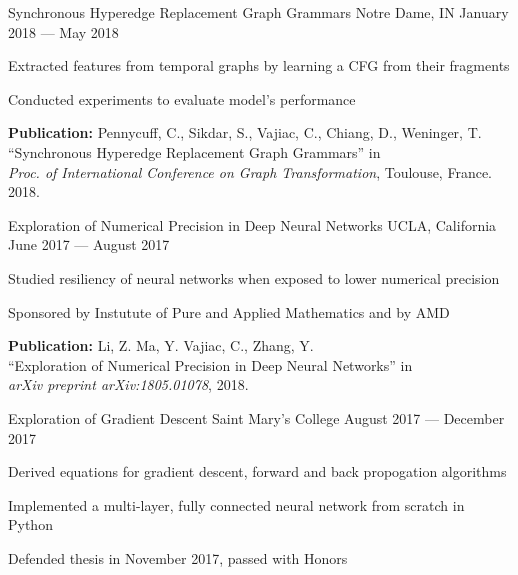 \begin{cventries}
  {Synchronous Hyperedge Replacement Graph Grammars}
  {Notre Dame, IN}
  {January 2018 --- May 2018}
  {\begin{cvitems}
    \item Extracted features from temporal graphs by learning a CFG from their
      fragments
    \item Conducted experiments to evaluate model's performance
    \item \textbf{ Publication:}
      Pennycuff, C., Sikdar, S., Vajiac, C., Chiang, D., Weninger, T. \\
      ``Synchronous Hyperedge Replacement Graph Grammars'' in \\
      \textit{Proc. of International Conference on Graph Transformation},
      Toulouse, France. 2018.
    \end{cvitems}
  }
  {Exploration of Numerical Precision in Deep Neural Networks}
  {UCLA, California}
  {June 2017 --- August 2017}
  {\begin{cvitems}
    \item Studied resiliency of neural networks when exposed to lower numerical precision
    \item Sponsored by Instutute of Pure and Applied Mathematics and by AMD
    \item 
      \textbf{ Publication:} Li, Z. Ma, Y. Vajiac, C., Zhang, Y. \\
      ``Exploration of Numerical Precision in Deep Neural Networks'' in \\
        \textit{arXiv preprint arXiv:1805.01078}, 2018.
    \end{cvitems}
  }
  {Exploration of Gradient Descent}
  {Saint Mary's College}
  {August 2017 --- December 2017}
  {\begin{cvitems}
    \item {Derived equations for gradient descent, forward and back propogation algorithms}
    \item {Implemented a multi-layer, fully connected neural network from scratch in Python}
    \item {Defended thesis in November 2017, passed with Honors}
    \end{cvitems}
}
\end{cventries}
